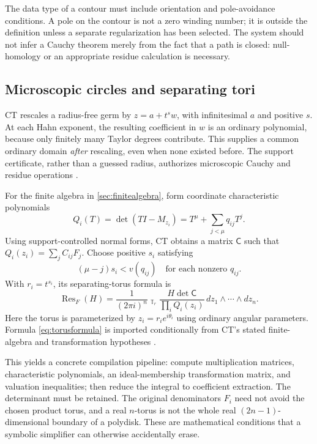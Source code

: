 \documentclass[11pt,letterpaper]{article}
\theoremstyle{definition}\newtheorem{definition}[theorem]{Definition}
\theoremstyle{remark}\newtheorem{remark}[theorem]{Remark}
\newcommand{\Res}{\operatorname{Res}}\newcommand{\res}{\operatorname{res}}
\newcommand{\HInt}{\mathop{\int^{\!H}}\nolimits}
\numberwithin{equation}{section}\setcounter{tocdepth}{2}
\begin{document}
The data type of a contour must include orientation and pole-avoidance conditions. A pole on the contour is not a zero winding number; it is outside the definition unless a separate regularization has been selected. The system should not infer a Cauchy theorem merely from the fact that a path is closed: null-homology or an appropriate residue calculation is necessary.

\subsection{Microscopic circles and separating tori}
CT rescales a radius-free germ by $z=a+t^s w$, with infinitesimal $a$ and positive $s$. At each Hahn exponent, the resulting coefficient in $w$ is an ordinary polynomial, because only finitely many Taylor degrees contribute. This supplies a common ordinary domain \emph{after} rescaling, even when none existed before. The support certificate, rather than a guessed radius, authorizes microscopic Cauchy and residue operations \cite{CT}.

For the finite algebra in \cref{sec:finitealgebra}, form coordinate characteristic polynomials
\[
 Q_i(T)=\det(TI-M_{z_i})=T^\mu+\sum_{j<\mu}q_{ij}T^j.
\]
Using support-controlled normal forms, CT obtains a matrix $\mathsf C$ such that $Q_i(z_i)=\sum_j C_{ij}F_j$. Choose positive $s_i$ satisfying
\begin{equation}\label{eq:radiusineq}
 (\mu-j)s_i<v(q_{ij})\quad\text{for each nonzero }q_{ij}.
\end{equation}
With $r_i=t^{s_i}$, its separating-torus formula is
\begin{equation}\label{eq:torusformula}
 \Res_F(H)=\frac{1}{(2\pi i)^n}
 \HInt_{\mathbb T_r}
 \frac{H\det\mathsf C}{\prod_i Q_i(z_i)}
 \,dz_1\wedge\cdots\wedge dz_n.
\end{equation}
Here the torus is parameterized by $z_i=r_i e^{i\theta_i}$ using ordinary angular parameters. Formula \eqref{eq:torusformula} is imported conditionally from CT's stated finite-algebra and transformation hypotheses \cite{CT}.

This yields a concrete compilation pipeline: compute multiplication matrices, characteristic polynomials, an ideal-membership transformation matrix, and valuation inequalities; then reduce the integral to coefficient extraction. The determinant must be retained. The original denominators $F_i$ need not avoid the chosen product torus, and a real $n$-torus is not the whole real $(2n-1)$-dimensional boundary of a polydisk. These are mathematical conditions that a symbolic simplifier can otherwise accidentally erase.
\end{document}

